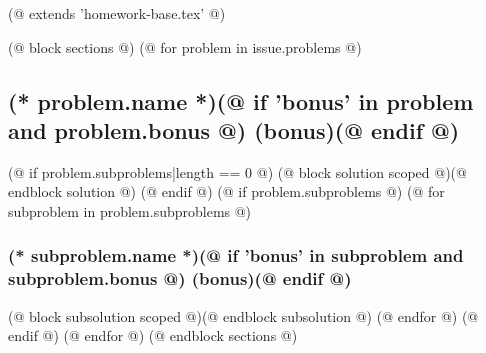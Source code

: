 (@ extends 'homework-base.tex' @)

(@ block sections @)
    (@ for problem in issue.problems @)
        \subsection{%
            \texorpdfstring{%
                (* problem.name *)(@ if 'bonus' in problem and problem.bonus @) (bonus)(@ endif @)%
            }{%
                \thesubsection{} (* problem.name *)(@ if 'bonus' in problem and problem.bonus @) (bonus)(@ endif @)%
            }%
        }
        \label{sec:(* problem.id *)}
        (@ if problem.subproblems|length == 0 @)
            (@ block solution scoped @)(@ endblock solution @)
        (@ endif @)
        (@ if problem.subproblems @)
            (@ for subproblem in problem.subproblems @)
                \subsubsection{%
                    \texorpdfstring{%
                        (* subproblem.name *)(@ if 'bonus' in subproblem and subproblem.bonus @) (bonus)(@ endif @)%
                    }{%
                        . (* subproblem.name *)(@ if 'bonus' in subproblem and subproblem.bonus @) (bonus)(@ endif @)%
                    }%
                }
                \label{sec:(* problem.id*)-(* subproblem.id *)}
                (@ block subsolution scoped @)(@ endblock subsolution @)
            (@ endfor @)
        (@ endif @)
    (@ endfor @)
(@ endblock sections @)
